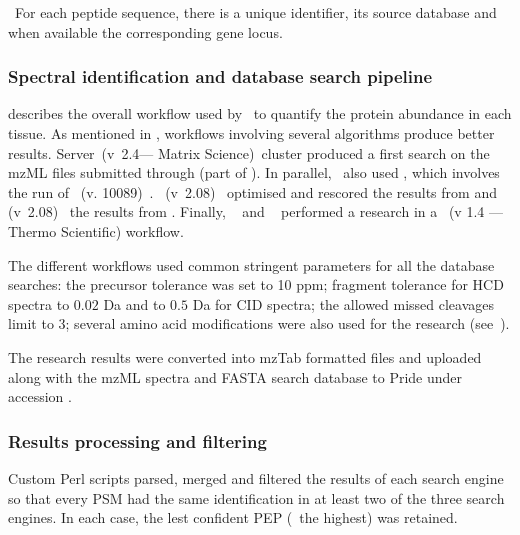\NB\ For each peptide sequence, there is a unique identifier, its source database
and when available the corresponding gene locus.

\subsubsection{Spectral identification and database search pipeline}

 describes the overall workflow used by
\james\ to quantify the protein abundance in each tissue. As mentioned in
, workflows involving several algorithms produce
better results.  Server~(v~2.4--- Matrix Science)~cluster produced
a first search on the mzML files submitted through 
(part of ). In parallel, \james\ also used  ,
which involves the run of ~(v. 10089)~.
~(v~2.08)~
optimised and rescored the results from  and
 (v~2.08)~ the
results from .
Finally, ~ and
~ performed a research in a
~(v 1.4 --- Thermo Scientific) workflow.

The different workflows used common stringent parameters for all the database
searches:
the precursor tolerance was set to 10 \gls{ppm};
fragment tolerance for \gls{HCD} spectra to $0.02$ \gls{Da} and
to $0.5$ \gls{Da} for \gls{CID} spectra;
the allowed missed cleavages limit to $3$; several amino acid modifications were
also used for the research (see~).

The research results were converted into mzTab formatted files and uploaded along
with the mzML spectra and FASTA search database to \gls{Pride}
under accession .

\subsubsection{Results processing and filtering}

Custom Perl scripts parsed, merged and filtered the results of each search engine
so that every \gls{PSM} had the same identification in at least two of the three
search engines.
In each case, the lest confident \gls{PEP} (\ie\ the highest) was retained.

